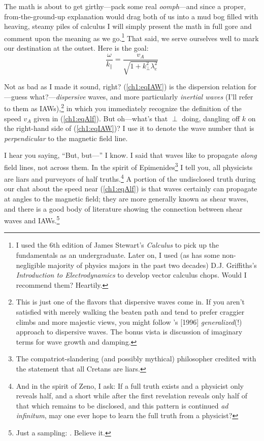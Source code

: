 The math is about to get girthy---pack some real \emph{oomph}---and since a
proper, from-the-ground-up explanation would drag both of us into a mud bog
filled with heaving, steamy piles of calculus I will simply present the math in
full gore and comment upon the meaning as we go.\footnote{I used the 6th edition
  of James Stewart's \textsl{Calculus} to pick up the fundamentals as an
  undergraduate. Later on, I used (as has some non-negligible majority of
  physics majors in the past two decades) D.J. Griffiths's \textsl{Introduction
    to Electrodynamics} to develop vector calculus chops. Would I recommend
  them? Heartily.} That said, we serve ourselves well to mark our destination at
the outset. Here is the goal:
\begin{equation}
  \label{ch1:eqIAW}
  \dfrac{\omega}{k_\parallel} = \dfrac{v_A}{ \sqrt{1 + k_\perp^2 \lambda_e^2 }}
\end{equation}

Not as bad as I made it sound, right? (\ref{ch1:eqIAW}) is the
dispersion relation for---guess what?---\emph{dispersive} \Alf waves, and more
particularly \emph{inertial \Alf waves} (I'll refer to them as
IAWs),\footnote{This is just one of the flavors that dispersive \Alf waves come
  in. If you aren't satisfied with merely walking the beaten path and tend to
  prefer craggier climbs and more majestic views, you might follow
  \citeauthor{Lysak1996}'s [1996] \emph{generalized}(!) approach to dispersive
  \Alf waves. The bonus vista is discussion of imaginary terms for wave growth
  and damping.} in which you immediately recognize the definition of the \Alf
speed $v_A$ given in (\ref{ch1:eqAlf}). But oh---what's that $\perp$ doing,
dangling off $k$ on the right-hand side of (\ref{ch1:eqIAW})?  I use it to
denote the wave number that is \emph{perpendicular} to the magnetic field line.

I hear you saying, ``But, but---'' I know. I said that \Alf waves like to
propagate \emph{along} field lines, not across them. In the spirit of
Epimenides\footnote{The compatriot-slandering (and possibly mythical)
  philosopher credited with the statement that all Cretans are liars.} I tell
you, all physicists are liars and purveyors of half truths.\footnote{And in the
  spirit of Zeno, I ask: If a full truth exists and a physicist only reveals
  half, and a short while after the first revelation reveals only half of that
  which remains to be disclosed, and this pattern is continued \textit{ad
    infinitum}, may one ever hope to learn the full truth from a physicist?} A
portion of the undisclosed truth during our chat about the \Alf speed near
(\ref{ch1:eqAlf}) is that \Alf waves certainly can propagate at angles to the
magnetic field; they are more generally known as shear \Alf waves, and there is
a good body of literature showing the connection between shear \Alf waves and
IAWs.\footnote{Just a sampling:
  \citet{Heyvaerts1983,Lysak1996,Rankin1999,Drozdenko2000,Vincena2004,Tsiklauri2005,Chaston2007d,Watt2009}. Believe
  it.}

